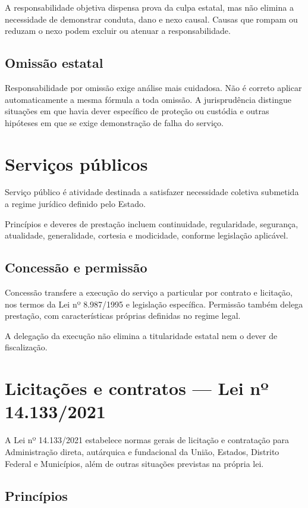 A responsabilidade objetiva dispensa prova da culpa estatal, mas não elimina a necessidade de demonstrar conduta, dano e nexo causal. Causas que rompam ou reduzam o nexo podem excluir ou atenuar a responsabilidade.

\subsection{Omissão estatal}

Responsabilidade por omissão exige análise mais cuidadosa. Não é correto aplicar automaticamente a mesma fórmula a toda omissão. A jurisprudência distingue situações em que havia dever específico de proteção ou custódia e outras hipóteses em que se exige demonstração de falha do serviço.

\section{Serviços públicos}

Serviço público é atividade destinada a satisfazer necessidade coletiva submetida a regime jurídico definido pelo Estado.

Princípios e deveres de prestação incluem continuidade, regularidade, segurança, atualidade, generalidade, cortesia e modicidade, conforme legislação aplicável.

\subsection{Concessão e permissão}

Concessão transfere a execução do serviço a particular por contrato e licitação, nos termos da Lei nº 8.987/1995 e legislação específica. Permissão também delega prestação, com características próprias definidas no regime legal.

A delegação da execução não elimina a titularidade estatal nem o dever de fiscalização.

\section{Licitações e contratos — Lei nº 14.133/2021}

A Lei nº 14.133/2021 estabelece normas gerais de licitação e contratação para Administração direta, autárquica e fundacional da União, Estados, Distrito Federal e Municípios, além de outras situações previstas na própria lei.

\subsection{Princípios}

